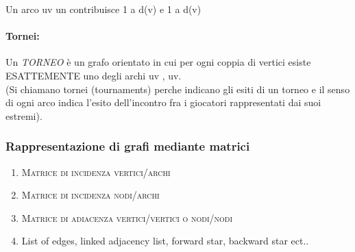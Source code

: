 Un arco uv un contribuisce 1 a d(v) e 1 a d(v)

\paragraph{Tornei:} Un \textit{TORNEO} è un grafo orientato in cui per ogni coppia di vertici esiste \textsc{ESATTEMENTE} uno degli archi uv , uv. \\
(Si chiamano tornei (tournaments) perche indicano gli esiti di un torneo e il senso di ogni arco indica l'esito dell'incontro fra i giocatori rappresentati dai suoi estremi).

\subsubsection{Rappresentazione di grafi mediante matrici}
\begin{enumerate}
\item \textsc{Matrice di incidenza vertici/archi}
\item \textsc{Matrice di incidenza nodi/archi}
\item \textsc{Matrice di adiacenza vertici/vertici o nodi/nodi}
\item List of edges, linked adjacency list, forward star, backward star ect..
\end{enumerate}

\newpage